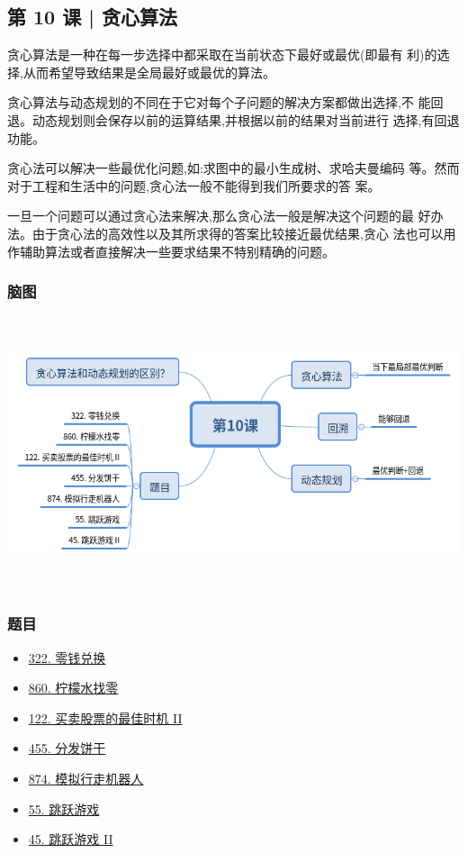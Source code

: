 \subsection{第 10 课 | 贪心算法}

贪心算法是一种在每一步选择中都采取在当前状态下最好或最优(即最有
利)的选择,从而希望导致结果是全局最好或最优的算法。

贪心算法与动态规划的不同在于它对每个子问题的解决方案都做出选择,不
能回退。动态规划则会保存以前的运算结果,并根据以前的结果对当前进行
选择,有回退功能。

贪心法可以解决一些最优化问题,如:求图中的最小生成树、求哈夫曼编码
等。然而对于工程和生活中的问题,贪心法一般不能得到我们所要求的答
案。

一旦一个问题可以通过贪心法来解决,那么贪心法一般是解决这个问题的最
好办法。由于贪心法的高效性以及其所求得的答案比较接近最优结果,贪心
法也可以用作辅助算法或者直接解决一些要求结果不特别精确的问题。

\subsubsection{脑图}

\includegraphics[width=170mm,height=80mm]{images/camp/第10课.png}

\subsubsection{题目}

\begin{itemize}
  \item \hyperref[leetcode:322]{322. 零钱兑换}
  \item \hyperref[leetcode:860]{860. 柠檬水找零}
  \item \hyperref[leetcode:122]{122. 买卖股票的最佳时机 II}
  \item \hyperref[leetcode:455]{455. 分发饼干}
  \item \hyperref[leetcode:874]{874. 模拟行走机器人}
  \item \hyperref[leetcode:55]{55. 跳跃游戏}
  \item \hyperref[leetcode:45]{45. 跳跃游戏 II}
\end{itemize}
